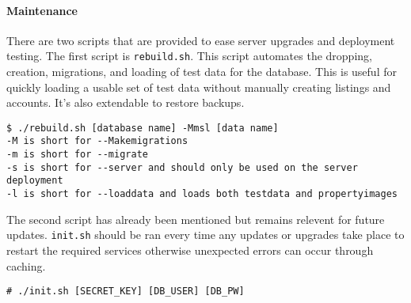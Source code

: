 \paragraph{Maintenance}

There are two scripts that are provided to ease server upgrades and deployment
testing. The first script is \lstinline{rebuild.sh}. This script automates the
dropping, creation, migrations, and loading of test data for the database.
This is useful for quickly loading a usable set of test data without manually
creating listings and accounts. It's also extendable to restore backups.
\begin{lstlisting}
$ ./rebuild.sh [database name] -Mmsl [data name]
-M is short for --Makemigrations
-m is short for --migrate
-s is short for --server and should only be used on the server deployment
-l is short for --loaddata and loads both testdata and propertyimages
\end{lstlisting}

The second script has already been mentioned but remains relevent for future
updates. \lstinline{init.sh} should be ran every time any updates or upgrades
take place to restart the required services otherwise unexpected errors can
occur through caching.
\begin{lstlisting}
# ./init.sh [SECRET_KEY] [DB_USER] [DB_PW]
\end{lstlisting}
